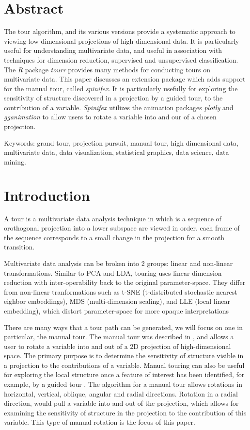 \documentclass{monashthesis}
\begin{document}
\section{Abstract}\label{abstract-1}

The tour algorithm, and its various versions provide a systematic
approach to viewing low-dimensional projections of high-dimensional
data. It is particularly useful for understanding multivariate data, and
useful in association with techniques for dimension reduction,
supervised and unsupervised classification. The \emph{R} package
\emph{tourr} provides many methods for conducting tours on multivariate
data. This paper discusses an extension package which adds support for
the manual tour, called \emph{spinifex}. It is particularly usefully for
exploring the sensitivity of structure discovered in a projection by a
guided tour, to the contribution of a variable. \emph{Spinifex} utilizes
the animation packages \emph{plotly} and \emph{gganimation} to allow
users to rotate a variable into and our of a chosen projection.

Keywords: grand tour, projection pursuit, manual tour, high dimensional
data, multivariate data, data visualization, statistical graphics, data
science, data mining.

\section{Introduction}\label{introduction}

A tour is a multivariate data analysis technique in which is a sequence
of orothogonal projection into a lower subspace are viewed in order.
each frame of the sequence corresponds to a small change in the
projection for a smooth transition.

Multivariate data analysis can be broken into 2 groups: linear and
non-linear transformations. Similar to PCA and LDA, touring uses linear
dimension reduction with inter-operability back to the original
parameter-space. They differ from non-linear tranformations such as
t-SNE (t-distributed stochastic nearest eighbor embeddings), MDS
(multi-dimension scaling), and LLE (local linear embedding), which
distort parameter-space for more opaque interpretations

There are many ways that a tour path can be generated, we will focus on
one in particular, the manual tour. The manual tour was described in
\textcite{cook_manual_1997}, and allows a user to rotate a variable into
and out of a 2D projection of high-dimensional space. The primary
purpose is to determine the sensitivity of structure visible in a
projection to the contributions of a variable. Manual touring can also
be useful for exploring the local structure once a feature of interest
has been identified, for example, by a guided tour
\autocite{cook_grand_1995}. The algorithm for a manual tour allows
rotations in horizontal, vertical, oblique, angular and radial
directions. Rotation in a radial direction, would pull a variable into
and out of the projection, which allows for examining the sensitivity of
structure in the projection to the contribution of this variable. This
type of manual rotation is the focus of this paper.
\end{document}
